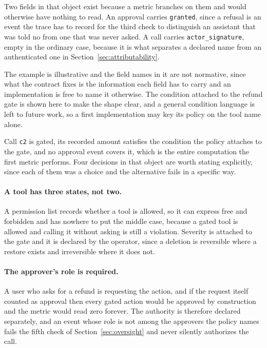 \documentclass[11pt,a4paper]{article}
\begin{document}
Two fields in that object exist because a metric branches on them and would otherwise
have nothing to read. An approval carries \texttt{granted}, since a refusal is an event
the trace has to record for the third check to distinguish an assistant that was told
no from one that was never asked. A call carries \texttt{actor\_signature}, empty in the
ordinary case, because it is what separates a declared name from an authenticated one
in Section~\ref{sec:attributability}.

The example is illustrative and the field names in it are not normative, since what
the contract fixes is the information each field has to carry and an implementation
is free to name it otherwise. The condition attached to the refund gate is shown
here to make the shape clear, and a general condition language is left to future
work, so a first implementation may key its policy on the tool name alone.

Call \texttt{c2} is gated, its recorded amount satisfies the condition the policy
attaches to the gate, and no approval event covers it, which is the entire
computation the first metric performs. Four decisions in that object are worth
stating explicitly, since each of them was a choice and the alternative fails in a
specific way.

\paragraph{A tool has three states, not two.} A permission list records whether a
tool is allowed, so it can express free and forbidden and has nowhere to put the
middle case, because a gated tool is allowed and calling it without asking is still
a violation. Severity is attached to the gate and it is declared by the operator,
since a deletion is reversible where a restore exists and irreversible where it does
not.

\paragraph{The approver's role is required.} A user who asks for a refund is
requesting the action, and if the request itself counted as approval then every
gated action would be approved by construction and the metric would read zero
forever. The authority is therefore declared separately, and an event whose role is
not among the approvers the policy names fails the fifth check of
Section~\ref{sec:oversight} and never silently authorizes the call.
\end{document}
